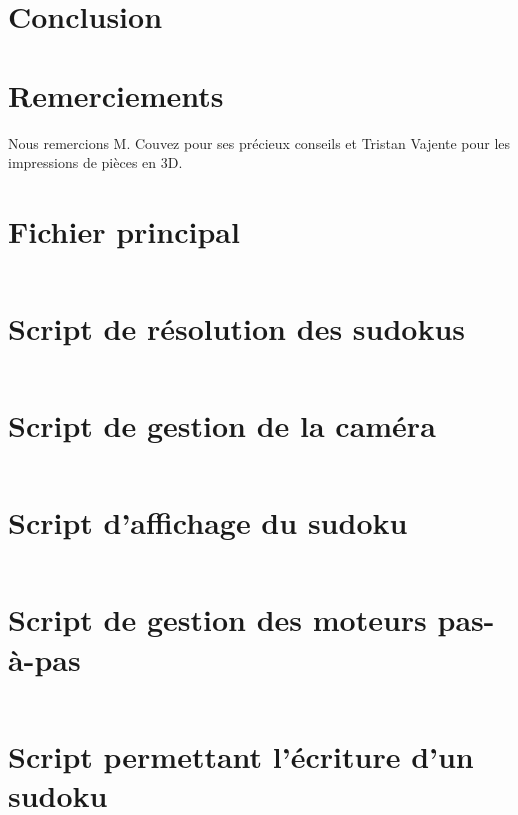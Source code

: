 \documentclass[12pt,a4paper]{report}
\newenvironment{changemargin}[2]{\begin{list}{}{%
\setlength{\topsep}{0pt}%
\setlength{\leftmargin}{0pt}%
\setlength{\rightmargin}{0pt}%
\setlength{\listparindent}{\parindent}%
\setlength{\itemindent}{\parindent}%
\setlength{\parsep}{0pt plus 1pt}%
\addtolength{\leftmargin}{#1}%
\addtolength{\rightmargin}{#2}%
}\item }{\end{list}}
\begin{document}
\chapter*{Conclusion}

\chapter*{Remerciements}

Nous remercions M. Couvez pour ses précieux conseils et Tristan Vajente pour les impressions de pièces en 3D.

\printbibliography
\nocite{*}
\appendix
\begin{changemargin}{-2cm}{-4cm}
\chapter{Fichier principal}
\label{main}
\inputminted[fontsize=\scriptsize, linenos=true]{Python}{../script/main.py}
\chapter{Script de résolution des sudokus}
\label{resolution}
\inputminted[fontsize=\scriptsize, linenos=true]{Python}{../script/resolution.py}
\chapter{Script de gestion de la caméra}
\label{camera}
\inputminted[fontsize=\scriptsize, linenos=true]{Python}{../script/camera.py}
\chapter{Script d'affichage du sudoku}
\label{display}
\inputminted[fontsize=\scriptsize, linenos=true]{Python}{../script/display.py}
\chapter{Script de gestion des moteurs pas-à-pas}
\label{step_motor}
\inputminted[fontsize=\scriptsize, linenos=true]{Python}{../script/step_motor.py}
\chapter{Script permettant l'écriture d'un sudoku}
\label{write}
\inputminted[fontsize=\scriptsize, linenos=true]{Python}{../script/write.py}

\end{changemargin}
\end{document}
